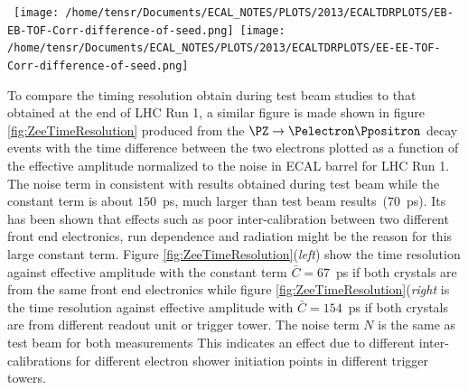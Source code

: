 \begin{center}
\centering
\mbox{
\texttt{[image: /home/tensr/Documents/ECAL\_NOTES/PLOTS/2013/ECALTDRPLOTS/EB-EB-TOF-Corr-difference-of-seed.png]}\quad
\texttt{[image: /home/tensr/Documents/ECAL\_NOTES/PLOTS/2013/ECALTDRPLOTS/EE-EE-TOF-Corr-difference-of-seed.png]}}
\label{fig:ZeeTimePerformance2}
\end{center}
To compare the timing resolution obtain during test beam studies to that obtained at the end of LHC Run 1, a similar figure is made shown in figure \ref{fig:ZeeTimeResolution} produced from the $\PZ \rightarrow \Pelectron \Ppositron$ decay events with the time difference between the two electrons plotted as a function of the effective amplitude normalized to the noise in ECAL barrel for LHC Run 1. The noise term in consistent with results obtained during test beam while the constant term is about $150$~ps, much larger than test beam results~($70$~ps). Its has been shown that effects such as poor inter-calibration between two different front end electronics, run dependence and radiation might be the reason for this large constant term. Figure \ref{fig:ZeeTimeResolution}(\textit{left}) show the time resolution against effective amplitude with the constant term $\bar{C} = 67$~ps if both crystals are from the same front end electronics  while figure \ref{fig:ZeeTimeResolution}(\textit{right} is the time resolution against effective amplitude with $\bar{C} = 154$~ps if both crystals are from different readout unit or trigger tower. The noise term $N$ is the same as test beam for both measurements This indicates an effect due to different inter-calibrations for different electron shower initiation points in different trigger towers.
